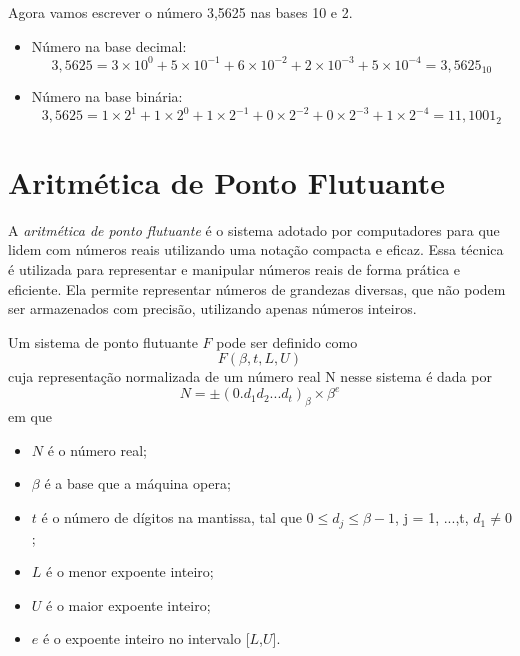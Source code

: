 \begin{ex}
Agora vamos escrever o número 3,5625 nas bases 10 e 2.

\begin{itemize}
    \item Número na base decimal: 
    \[
    3{,}5625 = 3 \times 10^0 + 5 \times 10^{-1} + 6 \times 10^{-2} + 2 \times 10^{-3} + 5 \times 10^{-4} = 3{,}5625_{10}
    \]
    
    \item Número na base binária:
    \[
    3{,}5625 = 1\times 2^{1} + 1 \times 2^0 + 1 \times 2^{-1} + 0 \times 2^{-2} + 0 \times 2^{-3} + 1 \times 2^{-4} = 11{,}1001_2
    \]
\end{itemize}
\end{ex}

\section{Aritmética de Ponto Flutuante}

A \textit{aritmética de ponto flutuante} é o sistema adotado por computadores para que lidem com números reais utilizando uma notação compacta e eficaz. Essa técnica é utilizada para representar e manipular números reais de forma prática e eficiente. Ela permite representar números de grandezas diversas, que não podem ser armazenados com precisão, utilizando apenas números inteiros.


Um sistema de ponto flutuante $F$ pode ser definido como
\[
F(\beta, t, L, U)\]
cuja representação normalizada de um número real N nesse sistema é dada por
\begin{equation}
N = \pm (0.d_{1}d_{2} . . . d_{t})_\beta \times \beta^e 
\end{equation}
em que
\begin{itemize}
  \item \( N \) é o número real;
  \item \(\beta\) é a base que a máquina opera;
  \item \( t \) é o número de dígitos na mantissa, tal que \( 0 \leq d_{j} \leq \beta-1 \), j = 1, ...,t, \(d_{1} \neq 0\);
  \item \( L \) é o menor expoente inteiro;
  \item \( U \) é o maior expoente inteiro;
  \item \( e \) é o expoente inteiro no intervalo [\( L \),\( U \)].
\end{itemize}


